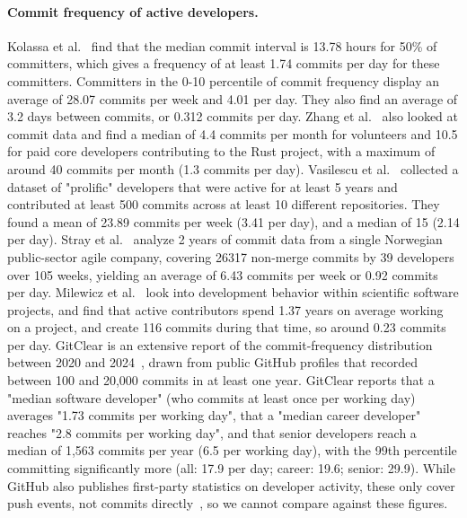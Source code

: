 \documentclass[smallextended]{svjour3}
\begin{document}
\paragraph{Commit frequency of active developers.}
Kolassa et al.~\cite{kolassa2013empirical} find that the median commit interval is 13.78 hours for 50\% of committers, which gives a frequency of at least 1.74 commits per day for these committers. Committers in the 0-10 percentile of commit frequency display an average of 28.07 commits per week and 4.01 per day. They also find an average of 3.2 days between commits, or 0.312 commits per day.
Zhang et al.~\cite{zhang2024how} also looked at commit data and find a median of 4.4 commits per month for volunteers and 10.5 for paid core developers contributing to the Rust project, with a maximum of around 40 commits per month (1.3 commits per day).
Vasilescu et al.~\cite{Vasilescu2016sky} collected a dataset of "prolific" developers that were active for at least 5 years and contributed at least 500 commits across at least 10 different repositories. They found a mean of 23.89 commits per week (3.41 per day), and a median of 15 (2.14 per day).
Stray et al.~\cite{stray2026copilot} analyze 2 years of commit data from a single Norwegian public-sector agile company, covering 26317 non-merge commits by 39 developers over 105 weeks, yielding an average of 6.43 commits per week or 0.92 commits per day.
Milewicz et al.~\cite{milewicz2019characterizing} look into development behavior within scientific software projects, and find that active contributors spend 1.37 years on average working on a project, and create 116 commits during that time, so around 0.23 commits per day.
GitClear is an extensive report of the commit-frequency distribution between 2020 and 2024~\cite{gitclear2024git}, drawn from public GitHub profiles that recorded between 100 and 20,000 commits in at least one year.
GitClear reports that a "median software developer" (who commits at least once per working day) averages "1.73 commits per working day", that a "median career developer" reaches "2.8 commits per working day", and that senior developers reach a median of 1,563 commits per year (6.5 per working day), with the 99th percentile committing significantly more (all: 17.9 per day; career: 19.6; senior: 29.9).
While GitHub also publishes first-party statistics on developer activity, these only cover push events, not commits directly~\cite{github2023innovationgraph,github2020octoverse}, so we cannot compare against these figures.
\end{document}
